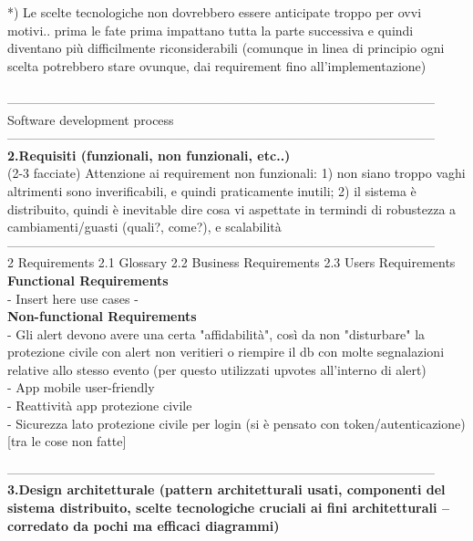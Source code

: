 \documentclass[10pt,english]{article}
\begin{document}
*) Le scelte tecnologiche non dovrebbero essere anticipate troppo per ovvi motivi.. prima le fate prima impattano tutta la parte successiva e quindi diventano più difficilmente riconsiderabili (comunque in linea di principio ogni scelta potrebbero stare ovunque, dai requirement fino all'implementazione) \\
\\-----------------------------------------------------------------------------------------------------\\
Software development process
\\-----------------------------------------------------------------------------------------------------\\
\textbf{2.Requisiti (funzionali, non funzionali, etc..)} \\
(2-3 facciate)
Attenzione ai requirement non funzionali: 1) non siano troppo vaghi altrimenti sono inverificabili, e quindi praticamente inutili; 2) il sistema è distribuito, quindi è inevitable dire cosa vi aspettate in termindi di robustezza a cambiamenti/guasti (quali?, come?), e scalabilità
\\-----------------------------------------------------------------------------------------------------\\

2 Requirements 
2.1 Glossary 
2.2 Business Requirements 
2.3 Users Requirements \\

\textbf{Functional Requirements}\\

- Insert here use cases -\\ 


\textbf{Non-functional Requirements}\\
- Gli alert devono avere una certa "affidabilità", così da non "disturbare" la protezione civile con alert non veritieri o riempire il db con molte segnalazioni relative allo stesso evento (per questo utilizzati upvotes all'interno di alert)\\

- App mobile user-friendly\\

- Reattività app protezione civile\\

- Sicurezza lato protezione civile per login (si è pensato con token/autenticazione) [tra le cose non fatte]



-----------------------------------------------------------------------------------------------------\\
\textbf{3.Design architetturale (pattern architetturali usati, componenti del sistema distribuito, scelte tecnologiche cruciali ai fini architetturali -- corredato da pochi ma efficaci diagrammi)} \\
\end{document}
